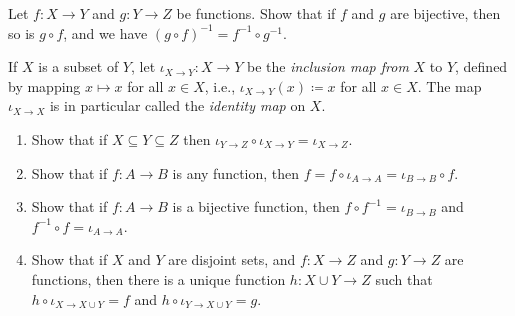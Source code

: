 \begin{exercise} \label{exercise 3.3.7}
Let \(f : X \rightarrow Y\) and \(g : Y \rightarrow Z\) be functions.
Show that if \(f\) and \(g\) are bijective, then so is \(g \circ f\), and we have \((g \circ f)^{-1} = f^{-1} \circ g^{-1}\).
\end{exercise}

\begin{exercise} \label{exercise 3.3.8}
If \(X\) is a subset of \(Y\), let \(\iota_{X \to Y} : X \to Y\) be the \emph{inclusion map from} \(X\) to \(Y\), defined by mapping \(x \mapsto x\) for all \(x \in X\), i.e., \(\iota_{X \to Y}(x) \coloneqq x\) for all \(x \in X\).
The map \(\iota_{X \to X}\) is in particular called the \emph{identity map} on \(X\).
    \begin{enumerate}
        \item Show that if \(X \subseteq Y \subseteq Z\) then \(\iota_{Y \to Z} \circ \iota_{X \to Y} = \iota_{X \to Z}\).
        \item Show that if \(f : A \to B\) is any function, then \(f = f \circ \iota_{A \to A} = \iota_{B \to B} \circ f\).
        \item Show that if \(f : A \to B\) is a bijective function, then \(f \circ f^{-1} = \iota_{B \to B}\) and \(f^{-1} \circ f = \iota_{A \to A}\).
        \item Show that if \(X\) and \(Y\) are disjoint sets, and \(f : X \to Z\) and \(g : Y \to Z\) are functions, then there is a unique function \(h : X \cup Y \to Z\) such that \(h \circ \iota_{X \to X \cup Y} = f\) and \(h \circ \iota_{Y \to X \cup Y} = g\).
    \end{enumerate}
\end{exercise}
